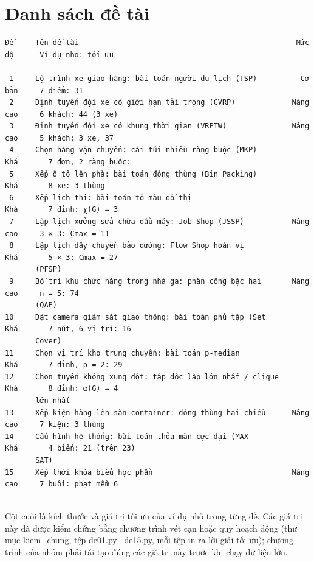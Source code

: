 \documentclass[a4paper,11pt]{article}
\begin{document}
\section{Danh sách đề tài}
\begin{Verbatim}[fontsize=\tiny,breaklines=true,breakanywhere=true]
Đề     Tên đề tài                                                  Mức độ      Ví dụ nhỏ: tối ưu

 1     Lộ trình xe giao hàng: bài toán người du lịch (TSP)          Cơ bản     7 điểm: 31
 2     Định tuyến đội xe có giới hạn tải trọng (CVRP)             Nâng cao     6 khách: 44 (3 xe)
 3     Định tuyến đội xe có khung thời gian (VRPTW)               Nâng cao     5 khách: 3 xe, 37
 4     Chọn hàng vận chuyển: cái túi nhiều ràng buộc (MKP)           Khá       7 đơn, 2 ràng buộc:
 5     Xếp ô tô lên phà: bài toán đóng thùng (Bin Packing)           Khá       8 xe: 3 thùng
 6     Xếp lịch thi: bài toán tô màu đồ thị                          Khá       7 đỉnh: χ(G) = 3
 7     Lập lịch xưởng sửa chữa đầu máy: Job Shop (JSSP)           Nâng cao     3 × 3: Cmax = 11
 8     Lập lịch dây chuyền bảo dưỡng: Flow Shop hoán vị              Khá       5 × 3: Cmax = 27
       (PFSP)
 9     Bố trí khu chức năng trong nhà ga: phân công bậc hai       Nâng cao     n = 5: 74
       (QAP)
10     Đặt camera giám sát giao thông: bài toán phủ tập (Set         Khá       7 nút, 6 vị trí: 16
       Cover)
11     Chọn vị trí kho trung chuyển: bài toán p-median               Khá       7 đỉnh, p = 2: 29
12     Chọn tuyến không xung đột: tập độc lập lớn nhất / clique      Khá       8 đỉnh: α(G) = 4
       lớn nhất
13     Xếp kiện hàng lên sàn container: đóng thùng hai chiều      Nâng cao     7 kiện: 3 thùng
14     Cấu hình hệ thống: bài toán thỏa mãn cực đại (MAX-            Khá       4 biến: 21 (trên 23)
       SAT)
15     Xếp thời khóa biểu học phần                                Nâng cao     7 buổi: phạt mềm 6


\end{Verbatim}
Cột cuối là kích thước và giá trị tối ưu của ví dụ nhỏ trong từng đề. Các giá trị này đã được kiểm chứng bằng chương trình vét cạn hoặc quy hoạch động (thư mục kiem\_chung, tệp de01.py– de15.py, mỗi tệp in ra lời giải tối ưu); chương trình của nhóm phải tái tạo đúng các giá trị này trước khi chạy dữ liệu lớn.
\end{document}
